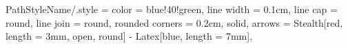 
\tikzset
{
	PathStyleName/.style =
	{
		color				= blue!40!green,	%
		line width			= 0.1cm,			%
		line cap			= round,			%
		line join			= round,			%
		rounded corners		= 0.2cm,			%
		solid,
		arrows =						%
		{
			Stealth[red, length = 3mm, open, round]	%
			-
			Latex[blue, length = 7mm],				%
		}
	}
}	%
